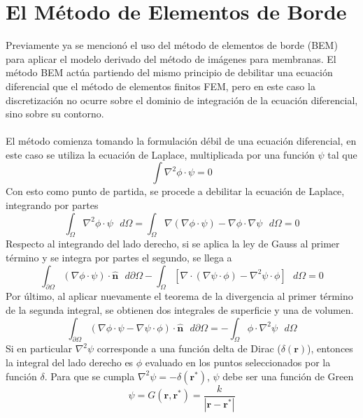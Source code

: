 \documentclass[12pt, oneside, numbers, spanish]{ezthesis}
\numberwithin{equation}{section}
\begin{document}
\section{El Método de Elementos de Borde}\label{Sec:BEM_theory}
Previamente ya se mencionó el uso del método de elementos de borde (BEM) para aplicar el modelo derivado del método de imágenes para membranas. El método BEM actúa partiendo del mismo principio de debilitar una ecuación diferencial que el método de elementos finitos FEM, pero en este caso la discretización no ocurre sobre el dominio de integración de la ecuación diferencial, sino sobre su contorno.\\\\
El método comienza tomando la formulación débil de una ecuación diferencial, en este caso se utiliza la ecuación de Laplace, multiplicada por una función $\psi$ tal que
\begin{equation}
\int\nabla^2 \phi\cdot\psi = 0
\end{equation}
Con esto como punto de partida, se procede a debilitar la ecuación de Laplace, integrando por partes
\begin{equation}
\int_\Omega \nabla^2\phi\cdot\psi\text{ }d\Omega = \int_\Omega \nabla(\nabla \phi\cdot\psi) - \nabla\phi\cdot\nabla\psi\text{ }d\Omega = 0
\end{equation}
Respecto al integrando del lado derecho, si se aplica la ley de Gauss al primer término y se integra por partes el segundo, se llega a
\begin{equation}
\int_{\partial\Omega} (\nabla\phi\cdot\psi)\cdot\hat{\mathbf{n}}\text{ }d\partial\Omega - \int_\Omega [\nabla\cdot(\nabla\psi\cdot\phi) - \nabla^2\psi\cdot\phi]\text{ }d\Omega = 0
\end{equation}
Por último, al aplicar nuevamente el teorema de la divergencia al primer término de la segunda integral, se obtienen dos integrales de superficie y una de volumen.
\begin{equation}
\int_{\partial\Omega} (\nabla\phi\cdot\psi - \nabla\psi\cdot\phi) \cdot\hat{\mathbf{n}}\text{ }d\partial\Omega = -\int_\Omega \phi\cdot\nabla^2\psi\text{ }d\Omega
\end{equation}
Si en particular $\nabla^2\psi$ corresponde a una función delta de Dirac ($\delta(\mathbf{r})$), entonces la integral del lado derecho es $\phi$ evaluado en los puntos seleccionados por la función $\delta$. Para que se cumpla $\nabla^2\psi = -\delta(\mathbf{r}^*)$, $\psi$ debe ser una función de Green
\begin{equation}
\psi = G(\mathbf{r},\mathbf{r}^*) = \frac{k}{|\mathbf{r} - \mathbf{r}^*|}
\end{equation}
\end{document}
